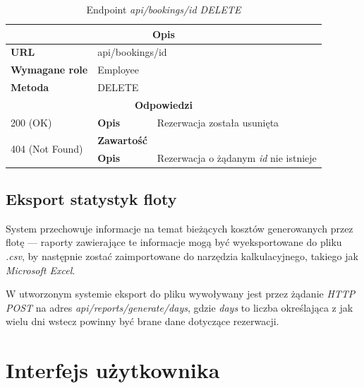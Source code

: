 \documentclass[eng,printmode,openany]{mgr}
\begin{document}
	\begin{table}[H]
		\caption{Endpoint \textit{api/bookings/id DELETE}}
		\begin{tabularx}{\textwidth}{|l|l|X|}
			\hline
			\multicolumn{3}{|c|}{\textbf{\textbf{Opis}}}
			\\ \hline
			\textbf{URL}                       & \multicolumn{2}{l|}{api/bookings/id}
			\\ \hline
			\textbf{Wymagane role}             & \multicolumn{2}{l|}{Employee}
			\\ \hline
			\textbf{Metoda}                    & \multicolumn{2}{l|}{DELETE}
			\\ \hline
			\multicolumn{3}{|c|}{\textbf{Odpowiedzi}}
			\\ \hline
			200 (OK)			                & \textbf{Opis}         	& Rezerwacja została usunięta
			\\ \hline
			\multirow{2}{*}{404 (Not Found)} 	& \textbf{Zawartość}     & 
			\\ \cline{2-3}                      & \textbf{Opis}          & Rezerwacja o żądanym \textit{id} nie istnieje
			\\ \hline
		\end{tabularx}
	\end{table}
	
	
	\newpage
	\subsection{Eksport statystyk floty}
	System przechowuje informacje na temat bieżących kosztów generowanych przez flotę — raporty zawierające te informacje mogą być wyeksportowane do pliku \textit{.csv}, by następnie zostać zaimportowane do narzędzia kalkulacyjnego, takiego jak \textit{Microsoft Excel}.
	
	W utworzonym systemie eksport do pliku wywoływany jest przez żądanie \textit{HTTP POST} na adres \textit{api/reports/generate/days}, gdzie \textit{days} to liczba określająca z jak wielu dni wstecz powinny być brane dane dotyczące rezerwacji.
	
	
	
	\newpage
	\section{Interfejs użytkownika}
\end{document}
